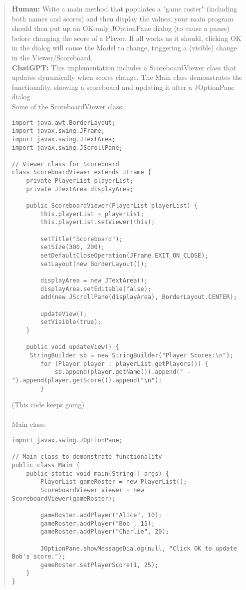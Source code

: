 \documentclass[a4paper,11pt]{article}
\begin{document}
\begin{quote}
\textbf{Human:} Write a main method that populates a "game roster" (including both names and scores) and then display the values; your main program should then put up an OK-only JOptionPane dialog (to cause a pause) before changing the score of a Player. If all works as it should, clicking OK in the dialog will cause the Model to change, triggering a (visible) change in the Viewer/Scoreboard. \\
\textbf{ChatGPT:} This implementation includes a ScoreboardViewer class that updates dynamically when scores change. The Main class demonstrates the functionality, showing a scoreboard and updating it after a JOptionPane dialog.  \\

Some of the ScoreboardViewer class:
\begin{lstlisting}
import java.awt.BorderLayout;
import javax.swing.JFrame;
import javax.swing.JTextArea;
import javax.swing.JScrollPane;

// Viewer class for Scoreboard
class ScoreboardViewer extends JFrame {
    private PlayerList playerList;
    private JTextArea displayArea;

    public ScoreboardViewer(PlayerList playerList) {
        this.playerList = playerList;
        this.playerList.setViewer(this);

        setTitle("Scoreboard");
        setSize(300, 200);
        setDefaultCloseOperation(JFrame.EXIT_ON_CLOSE);
        setLayout(new BorderLayout());

        displayArea = new JTextArea();
        displayArea.setEditable(false);
        add(new JScrollPane(displayArea), BorderLayout.CENTER);

        updateView();
        setVisible(true);
    }

    public void updateView() {
     StringBuilder sb = new StringBuilder("Player Scores:\n");
        for (Player player : playerList.getPlayers()) {
            sb.append(player.getName()).append(" - ").append(player.getScore()).append("\n");
        }

\end{lstlisting} (This code keeps going)\\\\
Main class: \begin{lstlisting}
import javax.swing.JOptionPane;

// Main class to demonstrate functionality
public class Main {
    public static void main(String[] args) {
        PlayerList gameRoster = new PlayerList();
        ScoreboardViewer viewer = new ScoreboardViewer(gameRoster);

        gameRoster.addPlayer("Alice", 10);
        gameRoster.addPlayer("Bob", 15);
        gameRoster.addPlayer("Charlie", 20);

        JOptionPane.showMessageDialog(null, "Click OK to update Bob's score.");
        gameRoster.setPlayerScore(1, 25);
    }
}
\end{lstlisting}
\end{quote}
\end{document}
